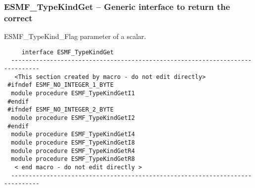  
\setlength{\oldparskip}{\parskip}
\setlength{\parskip}{1.5ex}
\setlength{\oldparindent}{\parindent}
\setlength{\parindent}{0pt}
\setlength{\oldbaselineskip}{\baselineskip}
\setlength{\baselineskip}{11pt}
 
\def\bv{\begin{verbatim}}
\def\ev{\end{verbatim}}
\def\be{\begin{equation}}
\def\ee{\end{equation}}
\def\bea{\begin{eqnarray}}
\def\eea{\end{eqnarray}}
\def\bi{\begin{itemize}}
\def\ei{\end{itemize}}
\def\bn{\begin{enumerate}}
\def\en{\end{enumerate}}
\def\bd{\begin{description}}
\def\ed{\end{description}}
\def\({\left (}
\def\){\right )}
\def\[{\left [}
\def\]{\right ]}
\def\<{\left  \langle}
\def\>{\right \rangle}
\def\cI{{\cal I}}
\def\diag{\mathop{\rm diag}}
\def\tr{\mathop{\rm tr}}


 
\subsubsection [ESMF\_TypeKindGet] {ESMF\_TypeKindGet -- Generic interface to return the correct}


   ESMF_TypeKind_Flag parameter of a scalar.
  
\begin{verbatim}     interface ESMF_TypeKindGet
  ------------------------------------------------------------------------------ 
   <This section created by macro - do not edit directly> 
 #ifndef ESMF_NO_INTEGER_1_BYTE 
  module procedure ESMF_TypeKindGetI1 
 #endif 
 #ifndef ESMF_NO_INTEGER_2_BYTE 
  module procedure ESMF_TypeKindGetI2 
 #endif 
  module procedure ESMF_TypeKindGetI4 
  module procedure ESMF_TypeKindGetI8 
  module procedure ESMF_TypeKindGetR4 
  module procedure ESMF_TypeKindGetR8 
   < end macro - do not edit directly > 
  ------------------------------------------------------------------------------ 
 \end{verbatim}
 
